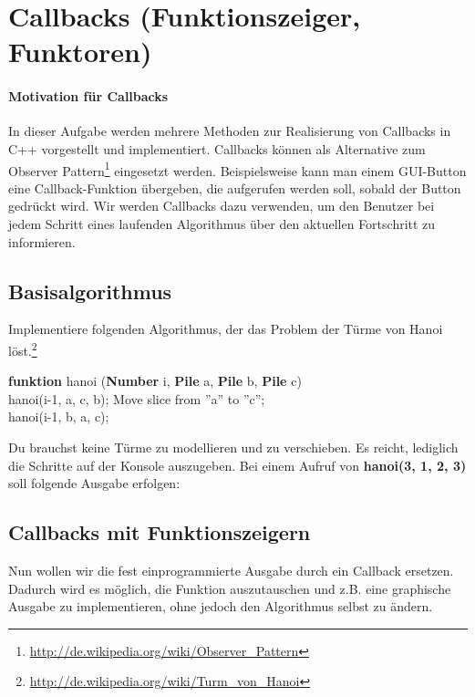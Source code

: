 \section{\ExercisePrefixAdvanced Callbacks (Funktionszeiger, Funktoren) \optional}
\label{sec:callbacks}

\optionaltextbox

\paragraph*{Motivation für Callbacks}
In dieser Aufgabe werden mehrere Methoden zur Realisierung von Callbacks in C++ vorgestellt und implementiert.
Callbacks können als Alternative zum Observer Pattern\footnote{\url{http://de.wikipedia.org/wiki/Observer_Pattern}} eingesetzt werden.
Beispielsweise kann man einem GUI-Button eine Callback-Funktion übergeben, die aufgerufen werden soll, sobald der Button gedrückt wird.
Wir werden Callbacks dazu verwenden, um den Benutzer bei jedem Schritt eines laufenden Algorithmus über den aktuellen Fortschritt zu informieren.

\subsection{Basisalgorithmus}
Implementiere folgenden Algorithmus, der das Problem der Türme von Hanoi löst.\footnote{\url{http://de.wikipedia.org/wiki/Turm_von_Hanoi}}\\
\begin{algorithm}[H]
 \SetAlgoLined
 \textbf{funktion} hanoi (\textbf{Number} i, \textbf{Pile} a, \textbf{Pile} b, \textbf{Pile} c) { \\
      {
        hanoi(i-1, a, c, b); 
        Move slice from ''a'' to ''c''; \\
        hanoi(i-1, b, a, c); 
     }
 }
\end{algorithm}

Du brauchst keine Türme zu modellieren und zu verschieben.
Es reicht, lediglich die Schritte auf der Konsole auszugeben. 
Bei einem Aufruf von \textbf{hanoi(3, 1, 2, 3)} soll folgende Ausgabe erfolgen:


\subsection{Callbacks mit Funktionszeigern}
Nun wollen wir die fest einprogrammierte Ausgabe durch ein Callback ersetzen. Dadurch wird es möglich, die Funktion auszutauschen und z.B. eine graphische Ausgabe zu implementieren, ohne jedoch den Algorithmus selbst zu ändern.


